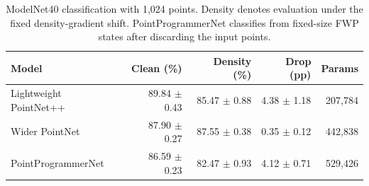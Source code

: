 \begin{table}[t]
\centering
\caption{ModelNet40 classification with 1,024 points. Density denotes evaluation under the fixed density-gradient shift. PointProgrammerNet classifies from fixed-size FWP states after discarding the input points.}
\label{tab:classification_accuracy}
\begin{tabular}{lrrrr}
\toprule
Model & Clean (\%) & Density (\%) & Drop (pp) & Params \\
\midrule
Lightweight PointNet++ & 89.84 $\pm$ 0.43 & 85.47 $\pm$ 0.88 & 4.38 $\pm$ 1.18 & 207,784 \\
Wider PointNet & 87.90 $\pm$ 0.27 & 87.55 $\pm$ 0.38 & 0.35 $\pm$ 0.12 & 442,838 \\
PointProgrammerNet & 86.59 $\pm$ 0.23 & 82.47 $\pm$ 0.93 & 4.12 $\pm$ 0.71 & 529,426 \\
\bottomrule
\end{tabular}
\end{table}



